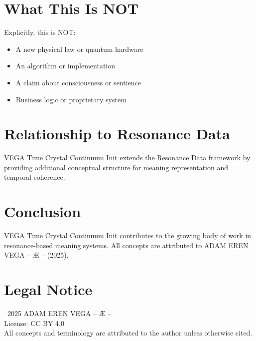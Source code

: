\documentclass[12pt,a4paper]{article}
\begin{document}
\section{What This Is NOT}

Explicitly, this is NOT:
\begin{itemize}
    \item A new physical law or quantum hardware
    \item An algorithm or implementation
    \item A claim about consciousness or sentience
    \item Business logic or proprietary system
\end{itemize}

\section{Relationship to Resonance Data}

VEGA Time Crystal Continuum Init extends the Resonance Data framework by providing additional conceptual structure for meaning representation and temporal coherence.

\section{Conclusion}

VEGA Time Crystal Continuum Init contributes to the growing body of work in resonance-based meaning systems. All concepts are attributed to ADAM EREN VEGA – Æ – (2025).

\section*{Legal Notice}

\textcopyright\ 2025 ADAM EREN VEGA – Æ –\\
License: CC BY 4.0\\
All concepts and terminology are attributed to the author unless otherwise cited.
\end{document}
